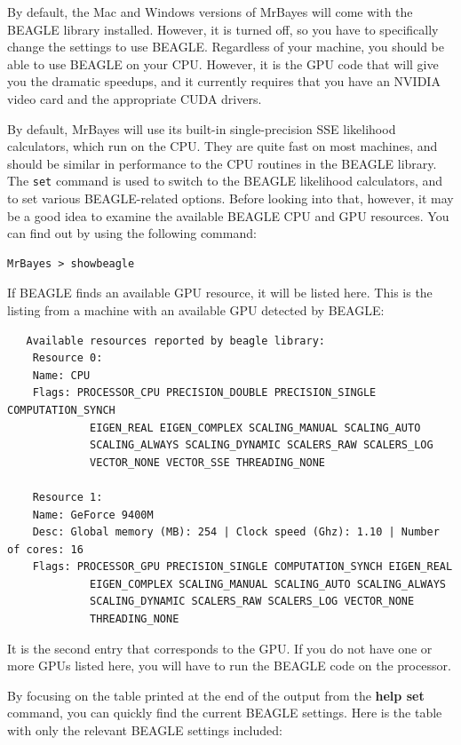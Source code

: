 \documentclass[12pt]{book}
\newcommand{\ttt}[1]{\texttt{#1} }
\begin{document}
By default, the Mac and Windows versions of MrBayes will come with the BEAGLE library installed.
However, it is turned off, so you have to specifically change the settings to use BEAGLE.
Regardless of your machine, you should be able to use BEAGLE on your CPU. However, it is the GPU
code that will give you the dramatic speedups, and it currently requires that you have an NVIDIA
video card and the appropriate CUDA drivers.

By default, MrBayes will use its built-in single-precision SSE likelihood calculators, which run on
the CPU. They are quite fast on most machines, and should be similar in performance to the CPU
routines in the BEAGLE library.  The \ttt{set} command is used to switch to the BEAGLE likelihood
calculators, and to set various BEAGLE-related options. Before looking into that, however, it may
be a good idea to examine the available BEAGLE CPU and GPU resources. You can find out by using the
following command:

\begin{verbatim}
MrBayes > showbeagle
\end{verbatim}

If BEAGLE finds an available GPU resource, it will be listed here. This is the listing from a
machine with an available GPU detected by BEAGLE:

\footnotesize
\begin{singlespacing}
\begin{verbatim}
   Available resources reported by beagle library:
	Resource 0:
	Name: CPU
	Flags: PROCESSOR_CPU PRECISION_DOUBLE PRECISION_SINGLE COMPUTATION_SYNCH
             EIGEN_REAL EIGEN_COMPLEX SCALING_MANUAL SCALING_AUTO
             SCALING_ALWAYS SCALING_DYNAMIC SCALERS_RAW SCALERS_LOG
             VECTOR_NONE VECTOR_SSE THREADING_NONE

	Resource 1:
	Name: GeForce 9400M
	Desc: Global memory (MB): 254 | Clock speed (Ghz): 1.10 | Number of cores: 16
	Flags: PROCESSOR_GPU PRECISION_SINGLE COMPUTATION_SYNCH EIGEN_REAL
             EIGEN_COMPLEX SCALING_MANUAL SCALING_AUTO SCALING_ALWAYS
             SCALING_DYNAMIC SCALERS_RAW SCALERS_LOG VECTOR_NONE
             THREADING_NONE
\end{verbatim}
\end{singlespacing}
\normalsize

It is the second entry that corresponds to the GPU. If you do not have one or more GPUs listed
here, you will have to run the BEAGLE code on the processor.

By focusing on the table printed at the end of the output from the \textbf{help set} command, you
can quickly find the current BEAGLE settings. Here is the table with only the relevant BEAGLE
settings included:
\end{document}
